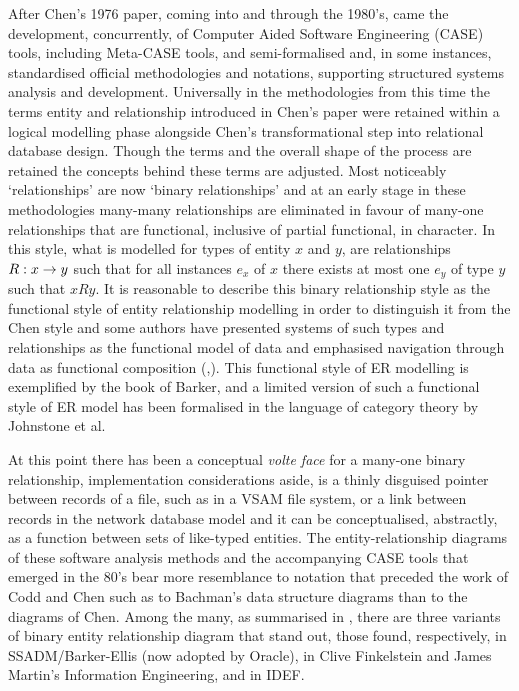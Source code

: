 After Chen's 1976 paper, coming into and through the 1980's, came the development, concurrently, of Computer Aided Software Engineering (CASE) tools, including Meta-CASE tools, and semi-formalised and, in some instances, standardised official methodologies and notations, supporting structured systems analysis and development. Universally in the methodologies from this time the terms entity and relationship introduced in Chen's paper  were retained within a logical modelling phase alongside Chen's transformational step into relational database design. Though the terms and the overall shape of the process are retained the concepts behind these terms are adjusted. Most noticeably `relationships' are now `binary relationships' and at an early stage in these methodologies many-many relationships are eliminated in favour of many-one relationships that are functional, inclusive of partial functional,  in character.
In this style, what is modelled  for  types of entity $x$ and $y$, are  relationships $R: x \rightarrow y$ such that for all instances $e_x$ of $x$
there exists at most one $e_y$ of type $y$ such that $x R y$. It is reasonable to describe this  binary relationship style as the functional style of entity relationship modelling in order to distinguish it from the Chen style
and some authors have presented  systems of such types and relationships as the functional model of data and emphasised navigation through data as 
functional composition (\cite{Buneman1979},\cite{Shipman1981}). 
This functional style of ER modelling is exemplified by the
book of Barker, and a limited version of such a functional style of ER model has been formalised in the language of category theory by Johnstone et al. 

At this point there has been a conceptual \textit{volte face} for a many-one  binary relationship, implementation considerations aside, is a thinly disguised pointer between records of a file, such as in a VSAM file system,  or a link between records in the network database model and it can be conceptualised, abstractly, as a function between sets of like-typed entities. The entity-relationship diagrams of these software analysis  methods and the accompanying CASE tools
that emerged in the 80's bear more resemblance to notation that preceded the work of Codd and Chen such as to Bachman's data structure diagrams than to the diagrams of Chen.  
Among the many, as summarised in  \cite{Rock-Evans1989},  there are three variants of binary entity relationship diagram that stand out, those found, respectively,  in SSADM/Barker-Ellis (now adopted by Oracle), in Clive Finkelstein and James Martin's Information Engineering,  and in IDEF.

